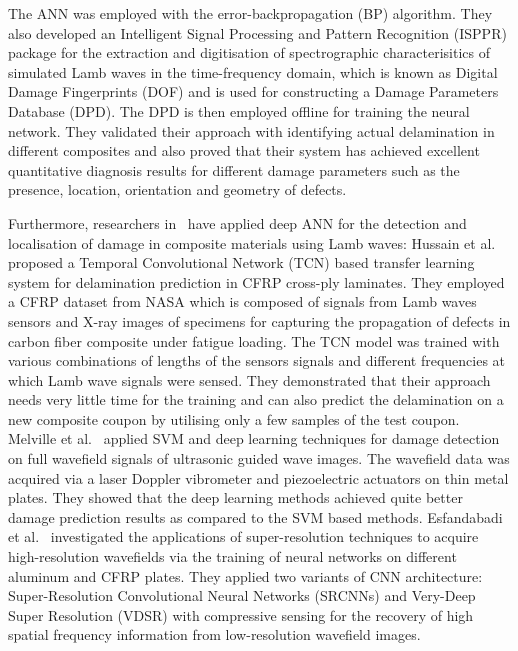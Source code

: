 The ANN was employed with the error-backpropagation (BP) algorithm. 
They also developed an Intelligent Signal Processing and Pattern Recognition (ISPPR) package for the extraction and digitisation of spectrographic characterisitics of simulated Lamb waves in the time-frequency domain, which is known as Digital Damage Fingerprints (DOF) and is used for constructing a Damage Parameters Database (DPD). 
The DPD is then employed offline for training the neural network. 
They validated their approach with identifying actual delamination in different composites and also proved that their system has achieved excellent quantitative diagnosis results for different damage parameters such as the presence, location, orientation and geometry of defects.

Furthermore, researchers in~\cite{hussaintemporal,melville2018structural,keshmiri2019deep}  have applied deep ANN for the detection and localisation of damage in composite materials using Lamb waves:
Hussain et al.~\cite{hussaintemporal} proposed a Temporal Convolutional Network (TCN) based transfer learning system for delamination prediction in CFRP cross-ply laminates. They employed a CFRP dataset from NASA which is composed of signals from Lamb waves sensors and X-ray images of specimens for capturing the propagation of defects in carbon fiber composite under fatigue loading. 
The TCN model was trained with various combinations of lengths of the sensors signals and different frequencies at which Lamb wave signals were sensed. 
They demonstrated that their approach needs very little time for the training and can also predict the delamination on a new composite coupon by utilising only a few samples of the test coupon. 
Melville et al.~\cite{melville2018structural} applied SVM and deep learning techniques for damage detection on full wavefield signals of ultrasonic guided wave images. The wavefield data was acquired via a laser Doppler vibrometer and piezoelectric actuators on thin metal plates. 
They showed that the deep learning methods achieved quite better damage prediction results as compared to the SVM based methods. 
Esfandabadi et al.~\cite{keshmiri2019deep} investigated the applications of super-resolution techniques to acquire high-resolution wavefields via the training of neural networks on different aluminum and CFRP plates. 
They applied two variants of CNN architecture: Super-Resolution Convolutional Neural Networks (SRCNNs) and Very-Deep Super Resolution (VDSR) with compressive sensing for the recovery of high spatial frequency information from low-resolution wavefield images.           

